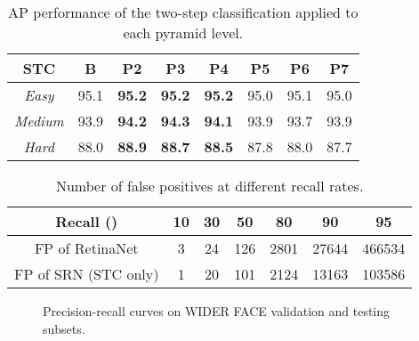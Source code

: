 \documentclass[letterpaper]{article} \usepackage{aaai19m}  \usepackage{times}  \usepackage{helvet}  \usepackage{courier}  \usepackage{url}  \usepackage{graphicx}  \usepackage{subfigure}
\begin{document}
\vspace{-1.5mm}
\begin{table}[h]
\centering
\setlength{\tabcolsep}{3pt}
\caption{AP performance of the two-step classification applied to each pyramid level.}
\setlength{\tabcolsep}{5.2pt}
\begin{tabular}{c|c|cccccc}
\toprule[1.5pt]
STC & B & P2 & P3 & P4 & P5 & P6 & P7 \\
\hline
{\em Easy} & 95.1 & \bf 95.2 & \bf 95.2 & \bf 95.2 & 95.0 & 95.1 & 95.0 \\
{\em Medium} & 93.9 & \bf 94.2 & \bf 94.3 & \bf 94.1 & 93.9 & 93.7 & 93.9 \\
{\em Hard} & 88.0 & \bf 88.9 & \bf 88.7 & \bf 88.5 & 87.8 & 88.0 & 87.7 \\
\bottomrule[1.5pt]
\end{tabular}
\vspace{-5mm}
\label{tab:stc_per_level}
\end{table}

\begin{table}[h]
\centering
\setlength{\tabcolsep}{3pt}
\caption{Number of false positives at different recall rates.}
\setlength{\tabcolsep}{2.0pt}
\begin{tabular}{c|cccccc}
\toprule[1.5pt]
Recall () & 10 & 30 & 50 & 80 & 90 & 95 \\
\hline
 FP of RetinaNet & 3 & 24 & 126 & 2801 & 27644 & 466534\\
 FP of SRN (STC only) & 1 & 20 & 101 & 2124 & 13163 & 103586\\
\bottomrule[1.5pt]
\end{tabular}
\vspace{-1.5mm}
\label{tab:fp_num}
\end{table}


\begin{figure*}[h]
\centering
{}
\caption{Precision-recall curves on WIDER FACE validation and testing subsets.}
\label{fig:wider-face-ap} \end{figure*}
\end{document}
